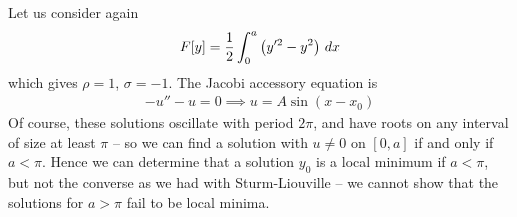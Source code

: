 \documentclass{../../template/note}
\begin{document}
    \begin{example*}
        Let us consider again
        \begin{align*}
            F[y] = \frac 1 2 \int_0^a \left(y'^2-y^2\right) \,d{x}
        \end{align*}
        which gives $\rho = 1$, $\sigma = -1$. The Jacobi accessory equation is
        \begin{align*}
            -u''-u=0 \implies u = A \sin (x-x_0)
        \end{align*}
        Of course, these solutions oscillate with period $2\pi$, and have roots on any interval of size at least $\pi$ -- so we can find a solution with $u \neq 0$ on $[0, a]$ if and only if $a < \pi$. Hence we can determine that a solution $y_0$ is a local minimum if $a < \pi$, but not the converse as we had with Sturm-Liouville -- we cannot show that the solutions for $a > \pi$ fail to be local minima.       
    \end{example*}
    
    
    
    
    
    
    
    
    
    
    
    
    
    
\end{document}

